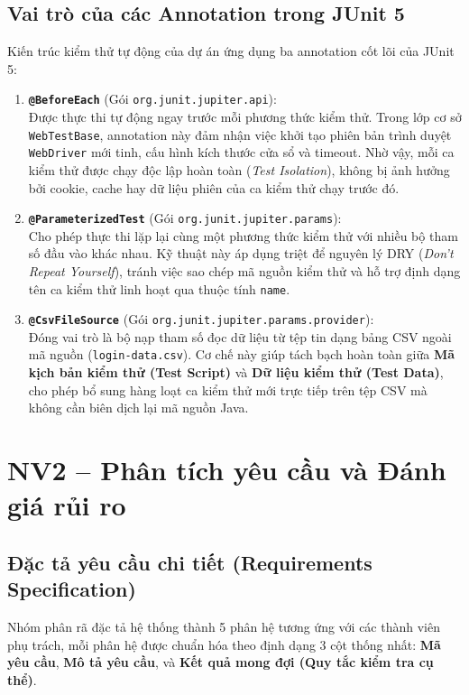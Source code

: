 \documentclass[a4paper]{article}
\begin{document}
\subsection{Vai trò của các Annotation trong JUnit 5}
Kiến trúc kiểm thử tự động của dự án ứng dụng ba annotation cốt lõi của JUnit 5:
\begin{enumerate}[\bfseries a)]
  \item \textbf{\texttt{@BeforeEach}} (Gói \texttt{org.junit.jupiter.api}):\\
  Được thực thi tự động ngay trước mỗi phương thức kiểm thử. Trong lớp cơ sở \texttt{WebTestBase}, annotation này đảm nhận việc khởi tạo phiên bản trình duyệt \texttt{WebDriver} mới tinh, cấu hình kích thước cửa sổ và timeout. Nhờ vậy, mỗi ca kiểm thử được chạy độc lập hoàn toàn (\textit{Test Isolation}), không bị ảnh hưởng bởi cookie, cache hay dữ liệu phiên của ca kiểm thử chạy trước đó.
  
  \item \textbf{\texttt{@ParameterizedTest}} (Gói \texttt{org.junit.jupiter.params}):\\
  Cho phép thực thi lặp lại cùng một phương thức kiểm thử với nhiều bộ tham số đầu vào khác nhau. Kỹ thuật này áp dụng triệt để nguyên lý DRY (\textit{Don't Repeat Yourself}), tránh việc sao chép mã nguồn kiểm thử và hỗ trợ định dạng tên ca kiểm thử linh hoạt qua thuộc tính \texttt{name}.
  
  \item \textbf{\texttt{@CsvFileSource}} (Gói \texttt{org.junit.jupiter.params.provider}):\\
  Đóng vai trò là bộ nạp tham số đọc dữ liệu từ tệp tin dạng bảng CSV ngoài mã nguồn (\texttt{login-data.csv}). Cơ chế này giúp tách bạch hoàn toàn giữa \textbf{Mã kịch bản kiểm thử (Test Script)} và \textbf{Dữ liệu kiểm thử (Test Data)}, cho phép bổ sung hàng loạt ca kiểm thử mới trực tiếp trên tệp CSV mà không cần biên dịch lại mã nguồn Java.
\end{enumerate}

\clearpage
\section{NV2 – Phân tích yêu cầu và Đánh giá rủi ro}
\subsection{Đặc tả yêu cầu chi tiết (Requirements Specification)}
Nhóm phân rã đặc tả hệ thống thành 5 phân hệ tương ứng với các thành viên phụ trách, mỗi phân hệ được chuẩn hóa theo định dạng 3 cột thống nhất: \textbf{Mã yêu cầu}, \textbf{Mô tả yêu cầu}, và \textbf{Kết quả mong đợi (Quy tắc kiểm tra cụ thể)}.
\end{document}
